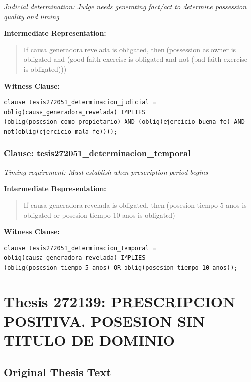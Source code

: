 \documentclass[11pt,a4paper]{article}
\begin{document}
\textit{Judicial determination: Judge needs generating fact/act to determine possession quality and timing}

\textbf{Intermediate Representation:}

\begin{quote}
If causa generadora revelada is obligated, then (possession as owner is obligated and (good faith exercise is obligated and not (bad faith exercise is obligated)))
\end{quote}

\textbf{Witness Clause:}

\begin{lstlisting}[style=witnessstyle, language=Witness]
clause tesis272051_determinacion_judicial = oblig(causa_generadora_revelada) IMPLIES (oblig(posesion_como_propietario) AND (oblig(ejercicio_buena_fe) AND not(oblig(ejercicio_mala_fe))));
\end{lstlisting}

\subsubsection{Clause: tesis272051\_determinacion\_temporal}

\textit{Timing requirement: Must establish when prescription period begins}

\textbf{Intermediate Representation:}

\begin{quote}
If causa generadora revelada is obligated, then (posesion tiempo 5 anos is obligated or posesion tiempo 10 anos is obligated)
\end{quote}

\textbf{Witness Clause:}

\begin{lstlisting}[style=witnessstyle, language=Witness]
clause tesis272051_determinacion_temporal = oblig(causa_generadora_revelada) IMPLIES (oblig(posesion_tiempo_5_anos) OR oblig(posesion_tiempo_10_anos));
\end{lstlisting}

\newpage

\section{Thesis 272139: PRESCRIPCION POSITIVA. POSESION SIN TITULO DE DOMINIO}
\label{thesis:272139}

\subsection{Original Thesis Text}
\end{document}
